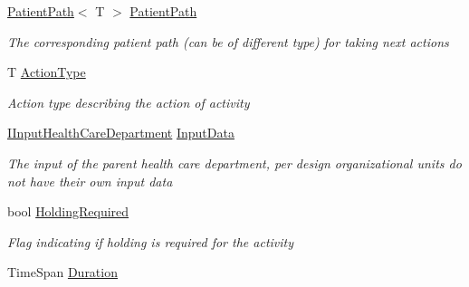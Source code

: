 \begin{DoxyCompactItemize}
\hyperlink{class_general_health_care_elements_1_1_general_classes_1_1_action_types_and_paths_1_1_patient_path}{Patient\+Path}$<$ T $>$ \hyperlink{class_general_health_care_elements_1_1_activities_1_1_activity_health_care_action_a566124f1689c521e6eeb49c5c0645d0e}{Patient\+Path}
\begin{DoxyCompactList}\small\item\em The corresponding patient path (can be of different type) for taking next actions \end{DoxyCompactList}\item 
T \hyperlink{class_general_health_care_elements_1_1_activities_1_1_activity_health_care_action_a1335426886e01ab0cdaf6adc5de53314}{Action\+Type}
\begin{DoxyCompactList}\small\item\em Action type describing the action of activity \end{DoxyCompactList}\item 
\hyperlink{interface_general_health_care_elements_1_1_input_1_1_i_input_health_care_department}{I\+Input\+Health\+Care\+Department} \hyperlink{class_general_health_care_elements_1_1_activities_1_1_activity_health_care_action_a1a8170a5ed126df1094787aa84761da9}{Input\+Data}
\begin{DoxyCompactList}\small\item\em The input of the parent health care department, per design organizational units do not have their own input data \end{DoxyCompactList}\item 
bool \hyperlink{class_general_health_care_elements_1_1_activities_1_1_activity_health_care_action_ad0642738e49577937983e95a73deca36}{Holding\+Required}
\begin{DoxyCompactList}\small\item\em Flag indicating if holding is required for the activity \end{DoxyCompactList}\item 
Time\+Span \hyperlink{class_general_health_care_elements_1_1_activities_1_1_activity_health_care_action_a8fa307d9481cb9e94b623fc71c467116}{Duration}

\end{DoxyCompactItemize}
